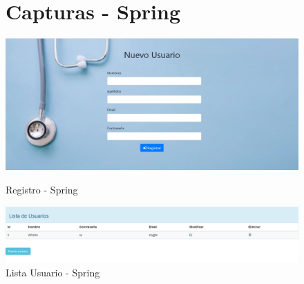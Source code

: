 \begin{figure}[H]
\section{Capturas - Spring}
\centering
\includegraphics[width=1.20\textwidth]{img/2}\par
	\caption{Registro - Spring}
	\label{fig:figura5}
\vspace{1.5cm}	
\centering	
\includegraphics[width=1.20\textwidth]{img/3}\par
	\caption{Lista Usuario - Spring}
	\label{fig:figura6}
\end{figure}